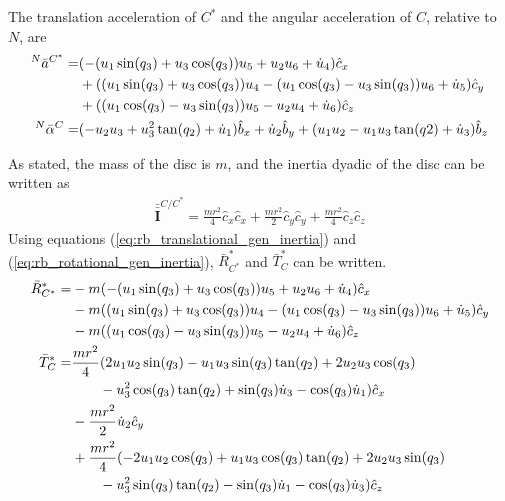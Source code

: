 \documentclass[smallcondensed,final]{svjour3}                     %
\begin{document}
The translation acceleration of $C^*$ and the angular acceleration of $C$,
relative to $N$, are
\begin{align}
    {^N}\bar{a}^{C^*} =& (-(u_1 \sin(q_3) + u_3 \cos(q_3)) u_5 + u_2 u_6 +
                         \dot{u}_4) \hat{c}_x \notag \\
                      & + ((u_1 \sin(q_3) + u_3 \cos(q_3)) u_4 - (u_1
                         \cos(q_3) - u_3 \sin(q_3)) u_6 + \dot{u}_5) \hat{c}_y
                         \notag\\
                      & + ((u_1 \cos(q_3) - u_3 \sin(q_3)) u_5 - u_2 u_4 +
                         \dot{u}_6) \hat{c}_z \\
    {^N}\bar{\alpha}^{C} =& (-u_2 u_3 + u_3^2 \tan(q_2) + \dot{u}_1) \hat{b}_x
                         + \dot{u}_2 \hat{b}_y + (u_1 u_2 - u_1 u_3 \tan(q2) +
                         \dot{u}_3) \hat{b}_z
\end{align}

As stated, the mass of the disc is $m$, and the inertia dyadic of the disc can
be written as
\begin{align}
    \bar{\bar{\mathbf{I}}}^{C/C^*} = \frac{m r^2}{4} \hat{c}_x\hat{c}_x +
    \frac{m r^2}{2} \hat{c}_y\hat{c}_y + \frac{m r^2}{4} \hat{c}_z\hat{c}_z
\end{align}
Using equations (\ref{eq:rb_translational_gen_inertia}) and
(\ref{eq:rb_rotational_gen_inertia}), $\bar{R}^*_{C^*}$ and $\bar{T}^*_C$ can be
written.
\begin{align}
    \bar{R}^*_{C^*} =& - m (- (u_{1} \sin(q_{3}) + u_{3}
                       \cos(q_{3})) u_{5} + u_{2} u_{6} +
                       \dot{u}_{4}) \hat{c}_x \notag \\
                     & - m ((u_{1} \sin(q_{3}) + u_{3}
                       \cos(q_{3})) u_{4} - (u_{1}
                       \cos(q_{3}) - u_{3}
                       \sin(q_{3})) u_{6} + \dot{u}_{5})
                       \hat{c}_y \notag \\
                     & - m ((u_{1} \cos(q_{3}) - u_{3}
                       \sin(q_{3})) u_{5} - u_{2} u_{4} +
                   \dot{u}_{6}) \hat{c}_z \\
    \bar{T}^*_C =& \frac{m r^{2}}{4} (2 u_{1} u_{2} \sin(q_{3})
                   - u_{1} u_{3} \sin(q_{3}) \tan(q_{2})
                   + 2 u_{2} u_{3} \cos(q_{3}) \notag\\&\quad\quad- u_{3}^2
                   \cos(q_{3}) \tan(q_{2}) +
                   \sin(q_{3}) \dot{u}_{3} - \cos(q_{3})
                   \dot{u}_{1}) \hat{c}_x \notag \\
                 & - \frac{m r^{2}}{2} \dot{u}_{2} \hat{c}_y \notag \\
                 & + \frac{m r^{2}}{4} (- 2 u_{1} u_{2}
                   \cos(q_{3}) + u_{1} u_{3} \cos(q_{3})
                   \tan(q_{2}) + 2 u_{2} u_{3}
                   \sin(q_{3}) \notag\\&\quad\quad - u_{3}^2 \sin(q_{3})
                   \tan(q_{2}) - \sin(q_{3}) \dot{u}_{1}
                   - \cos(q_{3}) \dot{u}_{3}) \hat{c}_z
\end{align}
\end{document}
